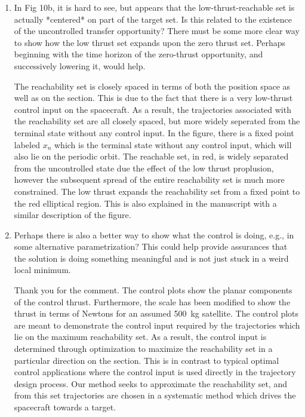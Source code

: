 \documentclass[11pt]{article}
\begin{document}
\begin{enumerate}
\item
    \begin{itshape}
In Fig 10b, it is hard to see, but appears that the low-thrust-reachable set is actually *centered* on part of the target set.  Is this related to the existence of the uncontrolled transfer opportunity?  There must be some more clear way to show how the low thrust set expands upon the zero thrust set.  Perhaps beginning with the time horizon of the zero-thrust opportunity, and successively lowering it, would help.  
\end{itshape}

The reachability set is closely spaced in terms of both the position space as well as on the \Poincare section.
This is due to the fact that there is a very low-thrust control input on the spacecraft.
As a result, the trajectories associated with the reachability set are all closely spaced, but more widely seperated from the terminal state without any control input.
In the figure, there is a fixed point labeled \( x_n \) which is the terminal state without any control input, which will also lie on the periodic orbit.
The reachable set, in red, is widely separated from the uncontrolled state due the effect of the low thrust proplusion, however the subsequent spread of the entire reachability set is much more constrained.
The low thrust expands the reachability set from a fixed point to the red elliptical region. 
This is also explained in the manuscript with a similar description of the figure.

\item
    \begin{itshape}
Perhaps there is also a better way to show what the control is doing, e.g., in some alternative parametrization?  This could help provide assurances that the solution is doing something meaningful and is not just stuck in a weird local minimum.  
\end{itshape}

Thank you for the comment.
The control plots show the planar components of the control thrust. 
Furthermore, the scale has been modified to show the thrust in terms of Newtons for an assumed \SI{500}{\kilo\gram} satellite.
The control plots are meant to demonstrate the control input required by the trajectories which lie on the maximum reachability set. 
As a result, the control input is determined through optimization to maximize the reachability set in a particular direction on the \Poincare section.
This is in contrast to typical optimal control applications where the control input is used directly in the trajectory design process.
Our method seeks to approximate the reachability set, and from this set trajectories are chosen in a systematic method which drives the spacecraft towards a target.


\end{enumerate}
\end{document}
